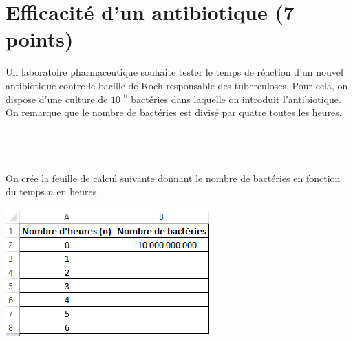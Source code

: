 
\section{Efficacité d'un antibiotique (7 points)}

Un laboratoire pharmaceutique souhaite tester le temps de réaction d'un nouvel antibiotique contre le bacille de Koch responsable des tuberculoses. Pour cela, on dispose d'une culture de $10^{10}$ bactéries dans laquelle on introduit l'antibiotique. On remarque que le nombre de bactéries est divisé par quatre toutes les heures.

\subsection{\ }

On crée la feuille de calcul suivante donnant le nombre de bactéries en fonction du temps $n$ en heures.

\begin{center}
	\includegraphics[scale=1]{img/bacteries}
\end{center}

